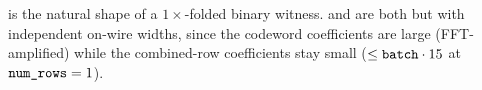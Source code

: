  is the natural shape of a $1\times$-folded
binary witness.  and  are both
 but with independent on-wire widths, since the
codeword coefficients are large (FFT-amplified) while the combined-row
coefficients stay small ($\le \texttt{batch}\cdot 15$ at
$\texttt{num\_rows} = 1$).
